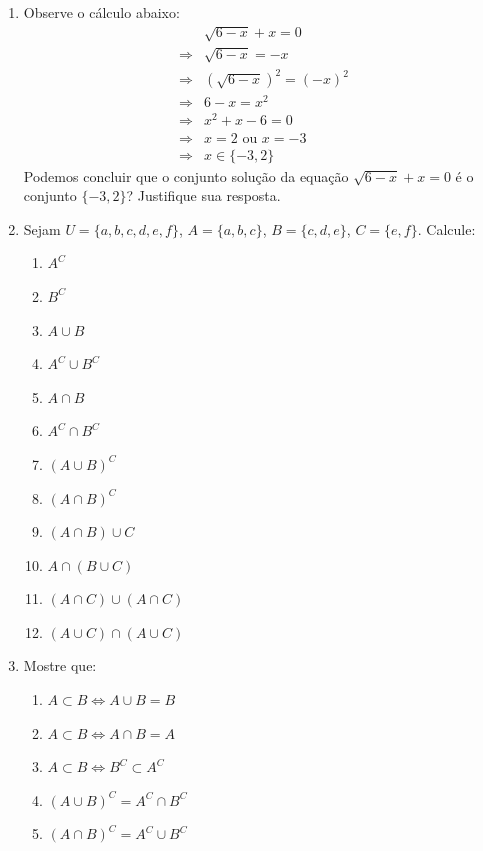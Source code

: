 \documentclass[a4paper,5pt]{amsbook}
\newcommand{\LRa}{\Leftrightarrow}
\begin{document}
\vspace{1cm}
\begin{enumerate}
    \vspace{0.5cm}
    \item Observe o c\'alculo abaixo:
        \begin{eqnarray*}
                        & \sqrt{6-x}+x=0 \\
            \Rightarrow & \sqrt{6-x} = -x \\
            \Rightarrow & {(\sqrt{6-x})}^2 = (-x)^2 \\
            \Rightarrow & 6-x = x^2 \\
            \Rightarrow & x^2 + x - 6 = 0 \\
            \Rightarrow & x = 2 \mbox{ ou } x = -3 \\
            \Rightarrow & x \in \{-3, 2\}
        \end{eqnarray*}
    Podemos concluir que o conjunto solu\c{c}\~ao da equa\c{c}\~ao $\sqrt{6-x}+x=0$ \'e o
    conjunto $\{-3,2\}$? Justifique sua resposta.

    \vspace{0.5cm}
    \item Sejam $U = \{a,b,c,d,e,f\}$, $A = \{a,b,c\}$, $B = \{c,d,e\}$, $C =
    \{e,f\}$. Calcule:
        \begin{enumerate}
            \item $A^C$
            \item $B^C$
            \item $A\cup B$
            \item $A^C \cup B^C$
            \item $A \cap B$
            \item $A^C \cap B^C$
            \item $(A\cup B)^C$
            \item $(A\cap B)^C$
            \item $(A\cap B)\cup C$
            \item $A\cap (B\cup C)$
            \item $(A\cap C)\cup (A\cap C)$
            \item $(A\cup C)\cap (A\cup C)$
        \end{enumerate}

     \vspace{0.5cm}
     \item Mostre que:
        \begin{enumerate}
            \item $A\subset B \LRa A\cup B = B$
            \item $A\subset B \LRa A\cap B = A$
            \item $A\subset B \LRa B^C\subset A^C$
            \item $(A\cup B)^C = A^C \cap B^C$
            \item $(A\cap B)^C = A^C \cup B^C$
        \end{enumerate}
\end{enumerate}
\end{document}
